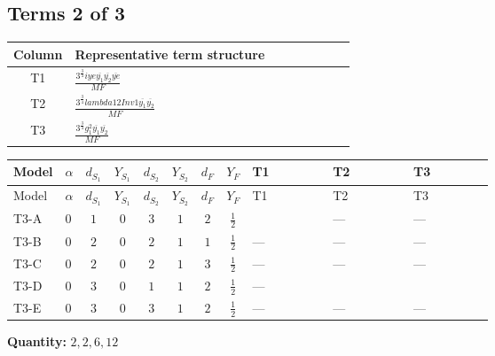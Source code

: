 \documentclass[8pt]{article}
\begin{document}
\begin{landscape}
\subsection*{Terms 2 of 3}
\begin{center}
\begin{tabular}{@{}c >{\raggedright\arraybackslash}p{0.82\linewidth}@{}}
\toprule
Column & Representative term structure \\
\midrule
T1 & \(\displaystyle \frac{3^{\frac{3}{4}} i ye \overline{y_{1}} \overline{y_{2}} \overline{ye}}{MF}\) \\
\midrule
T2 & \(\displaystyle \frac{3^{\frac{3}{4}} lambda12Inv1 \overline{y_{1}} \overline{y_{2}}}{MF}\) \\
\midrule
T3 & \(\displaystyle \frac{3^{\frac{3}{4}} g_{1}^{2} \overline{y_{1}} \overline{y_{2}}}{MF}\) \\
\midrule
\bottomrule
\end{tabular}
\end{center}
\smallskip
\tiny
\begin{longtable}{@{}llcccccc >{\raggedright\arraybackslash}p{0.21\linewidth} >{\raggedright\arraybackslash}p{0.21\linewidth} >{\raggedright\arraybackslash}p{0.21\linewidth}@{}}
\toprule
Model & $\alpha$ & $d_{S_1}$ & $Y_{S_1}$ & $d_{S_2}$ & $Y_{S_2}$ & $d_F$ & $Y_F$ & T1 & T2 & T3 \\
\midrule
\endfirsthead
\toprule
Model & $\alpha$ & $d_{S_1}$ & $Y_{S_1}$ & $d_{S_2}$ & $Y_{S_2}$ & $d_F$ & $Y_F$ & T1 & T2 & T3 \\
\midrule
\endhead
T3-A & $0$ & $1$ & $0$ & $3$ & $1$ & $2$ & $\frac{1}{2}$ & \scriptsize\adjustbox{max width=\linewidth}{$\begin{gathered} \frac{3^{\frac{3}{4}} i ye \overline{y_{1}} \overline{y_{2}} \overline{ye}}{12 MF}\end{gathered}$} & --- & --- \\
\midrule
T3-B & $0$ & $2$ & $0$ & $2$ & $1$ & $1$ & $\frac{1}{2}$ & --- & --- & --- \\
\midrule
T3-C & $0$ & $2$ & $0$ & $2$ & $1$ & $3$ & $\frac{1}{2}$ & --- & --- & --- \\
\midrule
T3-D & $0$ & $3$ & $0$ & $1$ & $1$ & $2$ & $\frac{1}{2}$ & --- & \scriptsize\adjustbox{max width=\linewidth}{$\begin{gathered} \frac{3^{\frac{3}{4}} lambda12Inv1 \overline{y_{1}} \overline{y_{2}}}{6 MF}\end{gathered}$} & \scriptsize\adjustbox{max width=\linewidth}{$\begin{gathered} \frac{3^{\frac{3}{4}} g_{1}^{2} \overline{y_{1}} \overline{y_{2}}}{8 MF}\end{gathered}$} \\
\midrule
T3-E & $0$ & $3$ & $0$ & $3$ & $1$ & $2$ & $\frac{1}{2}$ & --- & --- & --- \\
\midrule
\bottomrule
\end{longtable}
\clearpage
\noindent\textbf{Quantity: }$\mathrm{2,2,6,12}$\par\smallskip

\end{landscape}
\end{document}
